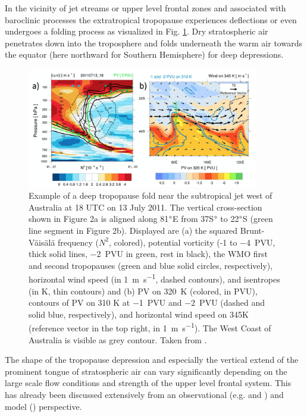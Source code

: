In the vicinity of jet streams or upper level frontal zones and associated with baroclinic processes the extratropical tropopause experiences deflections or even undergoes a folding process as visualized in Fig. \ref{fig:skerlakFold}. Dry stratospheric air penetrates down into the troposphere and folds underneath the warm air towards the equator (here northward for Southern Hemisphere) for deep depressions. %
%
\begin{figure}[t]
    \centering
    \includegraphics[width=0.9\textwidth]{figures_intro/Skerlak_Fold.png}
    \caption{Example of a deep tropopause fold near the subtropical jet west of Australia at 18 UTC on 13 July 2011. The vertical cross-section shown in Figure 2a is aligned along 81$\degree$E from 37S$\degree$ to 22$\degree$S (green line segment in Figure 2b). Displayed are (a) the squared Brunt-Väisälä frequency ($N^2$, colored), potential vorticity (-1 to \SI{-4}{PVU}, thick solid lines, \SI{-2}{PVU} in green, rest in black), the WMO first and second tropopauses (green and blue solid circles, respectively), horizontal wind speed (in \SI{1}{\meter\per\second}, dashed contours), and isentropes (in K, thin contours) and (b) PV on \SI{320}{K} (colored, in PVU), contours of PV on 310 K at \SI{-1}{PVU} and \SI{-2}{PVU} (dashed and solid blue, respectively), and horizontal wind speed on 345K (reference vector in the top right, in \SI{1}{\meter\per\second}). The West Coast of Australia is visible as grey contour. Taken from \cite{skerlak_tropopause_2015}.}
    \label{fig:skerlakFold}
\end{figure}
%
The shape of the tropopause depression and especially the vertical extend of the prominent tongue of stratospheric air can vary significantly depending on the large scale flow conditions and strength of the upper level frontal system. This has already been discussed extensively from an observational (e.g. \cite{shapiro_further_1978} and \cite{keyser_review_1986}) and model (\cite{skerlak_tropopause_2015}) perspective. \\
